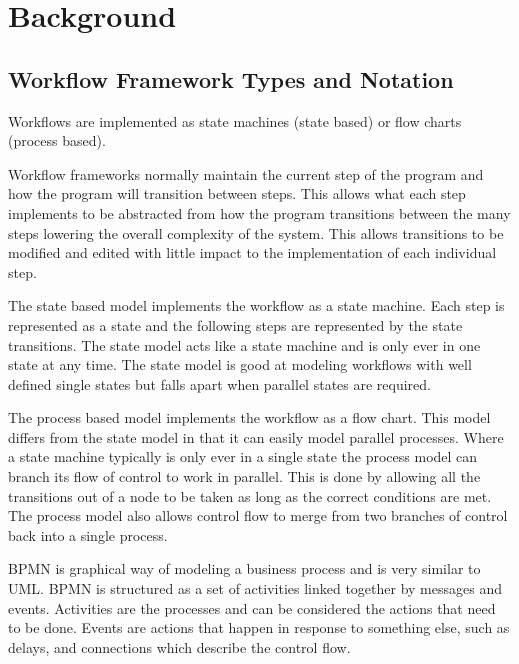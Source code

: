 \documentclass[document.tex]{subfiles}
\begin{document}
\chapter {Background}
\label {ch:background}


\section {Workflow Framework Types and Notation}
\label {sec:overview-of-workflows}


Workflows are implemented as state machines (state based) or flow charts (process based).

Workflow frameworks normally maintain the current step of the program and how the program will transition between steps. This allows what each step implements to be abstracted from how the program transitions between the many steps lowering the overall complexity of the system. This allows transitions to be modified and edited with little impact to the implementation of each individual step.

The state based model implements the workflow as a state machine. Each step is represented as a state and the following steps are represented by the state transitions. The state model acts like a state machine and is only ever in one state at any time. The state model is good at modeling workflows with well defined single states but falls apart when parallel states are required.

The process based model implements the workflow as a flow chart. This model differs from the state model in that it can easily model parallel processes. Where a state machine typically is only ever in a single state the process model can branch its flow of control to work in parallel. This is done by allowing all the transitions out of a node to be taken as long as the correct conditions are met. The process model also allows control flow to merge from two branches of control back into a single process.

BPMN \cite{bpmn} is graphical way of modeling a business process and is very similar to UML. BPMN is structured as a set of activities linked together by messages and events. Activities are the processes and can be considered the actions that need to be done. Events are actions that happen in response to something else, such as delays, and connections which describe the control flow.
\end{document}
